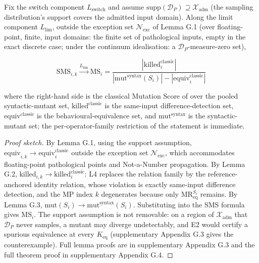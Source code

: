 \documentclass[manuscript,screen,review]{acmart}
\begin{document}
\begin{theorem}\label{thm:degeneration}
Fix the switch component $L_{\mathrm{switch}}$ and assume
$\mathrm{supp}(\mathcal{D}_P) \supseteq \mathcal{X}_{\mathrm{adm}}$ (the
sampling distribution's support covers the admitted input domain). Along
the limit component $L_{\mathrm{lim}}$, outside the exception set
$\mathcal{N}_{\mathrm{exc}}$ of Lemma G.1 (over floating-point, finite,
input domains: the finite set of pathological inputs, empty in the exact
discrete case; under the continuum idealisation: a
$\mathcal{D}_P$-measure-zero set),

\[ \mathrm{SMS}_{i,k} \xrightarrow{L_{\mathrm{lim}}} \mathrm{MS}_{i} = \frac{|\mathrm{killed}_{i}^{\mathrm{classic}}|}{|\mathrm{mut}^{\mathrm{syntax}}(S_i)| - |\mathrm{equiv}_{i}^{\mathrm{classic}}|} \]

where the right-hand side is the classical Mutation Score of
\citet{d7c38286734419b52de4262c9802ebdfcf4b9447} over the pooled syntactic-mutant set,
$\mathrm{killed}^{\mathrm{classic}}$ is the same-input
difference-detection set,
$\mathrm{equiv}^{\mathrm{classic}}$ is the behavioural-equivalence set,
and $\mathrm{mut}^{\mathrm{syntax}}$ is the syntactic-mutant set; the
per-operator-family restriction of the statement is immediate.
\end{theorem}

\begin{proof}[Proof sketch]
By Lemma G.1, using the support assumption,
$\mathrm{equiv}_{i,k} \to \mathrm{equiv}_{i}^{\mathrm{classic}}$ outside
the exception set $\mathcal{N}_{\mathrm{exc}}$, which accommodates
floating-point pathological points
and Not-a-Number propagation. By Lemma G.2,
$\mathrm{killed}_{i,k} \to \mathrm{killed}_{i}^{\mathrm{classic}}$: L4
replaces the relation family by the reference-anchored identity
relation, whose violation is exactly same-input difference detection,
and the MP index $k$ degenerates because only
$\mathrm{MR}_{\mathrm{eq}}^{S_i}$ remains. By Lemma G.3,
$\mathrm{mut}(S_i) \to \mathrm{mut}^{\mathrm{syntax}}(S_i)$.
Substituting into the SMS formula gives $\mathrm{MS}_i$. The support
assumption is not removable: on a region of $\mathcal{X}_{\mathrm{adm}}$
that $\mathcal{D}_P$ never samples, a mutant may diverge undetectably,
and E2 would certify a spurious equivalence at every $K_{\mathrm{eq}}$
(supplementary Appendix G.3 gives the counterexample). Full lemma proofs
are in supplementary Appendix G.3 and the
full theorem proof in supplementary Appendix G.4.
\end{proof}
\end{document}
